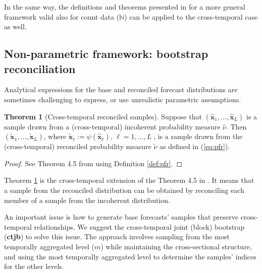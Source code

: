 \documentclass[a4paper,11pt]{article}
\newcommand{\xvet}{\bm{x}}
\theoremstyle{definition}
\newtheorem{theorem}{Theorem}[section]
\begin{document}
In the same way, the definitions and theorems presented in \citet{corani2021} for a more general framework valid also for count data ($\mathbb{N}$) can be applied to the cross-temporal case as well.


\subsection{Non-parametric framework: bootstrap reconciliation}\label{ssec:boot}

Analytical expressions for the base and reconciled forecast distributions are sometimes challenging to express, or use unrealistic parametric assumptions.

\begin{theorem}[Cross-temporal reconciled samples] \label{thm:rs}
	Suppose that $\left(\widehat{\xvet}_1, \ldots, \widehat{\xvet}_L\right)$ is a sample drawn from a (cross-temporal) incoherent probability measure $\widehat{\nu}$. Then $\left(\widetilde{\xvet}_1, \ldots, \widetilde{\xvet}_L\right)$, where $\widetilde{\xvet}_\ell:=\psi\left(\widehat{\xvet}_\ell\right)$, $\ell= 1, \ldots, L\;$, is a sample drawn from the (cross-temporal) reconciled probability measure $\widetilde{\nu}$ as defined in (\ref{eq:pfr}).
\end{theorem}
\begin{proof}
	See Theorem 4.5 from \cite{panagiotelis2023} using Definition \ref{def:pfr}.
\end{proof}
Theorem \ref{thm:rs} is the cross-temporal extension of the Theorem 4.5 in \cite{panagiotelis2023}. It means that a sample from the reconciled distribution can be obtained by reconciling each member of a sample from the incoherent distribution.

An important issue is how to generate base forecasts' samples that preserve cross-temporal relationships. We suggest the cross-temporal joint (block) bootstrap (\textbf{ctjb}) to solve this issue. The approach involves sampling from the most temporally aggregated level ($m$) while maintaining the cross-sectional structure, and using the most temporally aggregated level to determine the samples' indices for the other levels.




\end{document}
